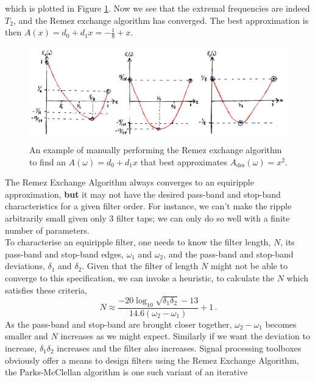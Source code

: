 \begin{exmp}
  which is plotted in Figure \ref{fig::lecture_17_remez_iteration}. Now we see that
  the extremal frequencies
  are indeed $T_2$, and the Remez exchange algorithm has converged. The best
  approximation is then $A(x) = d_0 + d_1 x = - \frac{1}{8} + x$.
  \begin{figure}[H]
    \includegraphics[width=\textwidth]{images/lecture_17_remez_iteration.JPG}
    \caption{An example of manually performing the Remez exchange algorithm
      to find an $A(\omega) = d_0 + d_1 x$ that best approximates
      $A_\mathrm{des}(\omega) = x^2$.
    }
    \label{fig::lecture_17_remez_iteration}
  \end{figure}

\end{exmp}
%
The Remez Exchange Algorithm always converges to an equiripple approximation,
\textbf{but} it may not have the desired pass-band and stop-band characteristics for
a given filter order. For instance, we can't make the ripple arbitrarily small
given only 3 filter taps; we can only do so well with a finite number of
parameters.\\
%
To characterise an equiripple filter, one needs to know the filter length, $N$,
its pass-band and stop-band edges, $\omega_1$ and $\omega_2$, and the pass-band
and stop-band deviations, $\delta_1$ and $\delta_2$. Given that the filter of
length $N$ might not be able to converge to this specification, we can invoke a
heuristic, to calculate the $N$ which satisfies these criteria,
%
\begin{displaymath}
  N \approx \frac{-20 \log_10\sqrt{\delta_1\delta_2} - 13}{14.6(\omega_2 - \omega_1)} + 1 \,.
\end{displaymath}
%
As the pass-band and stop-band are brought closer together, $\omega_2 - \omega_1$
becomes smaller and $N$ increases as we might expect. Similarly if we want
the deviation to increase, $\delta_1\delta_2$ increases and the
filter also increases. Signal processing toolboxes obviously offer
a means to design filters using the Remez Exchange Algorithm,
the Parks-McClellan algorithm is one such variant of an iterative
